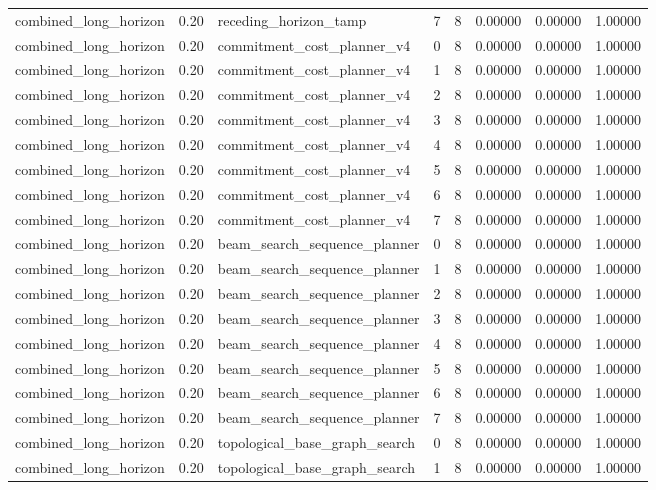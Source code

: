 \documentclass{article}
\begin{document}
\begin{table}[tbp]
{\begin{tabular}{llllllll}
combined\_long\_horizon & 0.20 & receding\_horizon\_tamp & 7 & 8 & 0.00000 & 0.00000 & 1.00000 \\
combined\_long\_horizon & 0.20 & commitment\_cost\_planner\_v4 & 0 & 8 & 0.00000 & 0.00000 & 1.00000 \\
combined\_long\_horizon & 0.20 & commitment\_cost\_planner\_v4 & 1 & 8 & 0.00000 & 0.00000 & 1.00000 \\
combined\_long\_horizon & 0.20 & commitment\_cost\_planner\_v4 & 2 & 8 & 0.00000 & 0.00000 & 1.00000 \\
combined\_long\_horizon & 0.20 & commitment\_cost\_planner\_v4 & 3 & 8 & 0.00000 & 0.00000 & 1.00000 \\
combined\_long\_horizon & 0.20 & commitment\_cost\_planner\_v4 & 4 & 8 & 0.00000 & 0.00000 & 1.00000 \\
combined\_long\_horizon & 0.20 & commitment\_cost\_planner\_v4 & 5 & 8 & 0.00000 & 0.00000 & 1.00000 \\
combined\_long\_horizon & 0.20 & commitment\_cost\_planner\_v4 & 6 & 8 & 0.00000 & 0.00000 & 1.00000 \\
combined\_long\_horizon & 0.20 & commitment\_cost\_planner\_v4 & 7 & 8 & 0.00000 & 0.00000 & 1.00000 \\
combined\_long\_horizon & 0.20 & beam\_search\_sequence\_planner & 0 & 8 & 0.00000 & 0.00000 & 1.00000 \\
combined\_long\_horizon & 0.20 & beam\_search\_sequence\_planner & 1 & 8 & 0.00000 & 0.00000 & 1.00000 \\
combined\_long\_horizon & 0.20 & beam\_search\_sequence\_planner & 2 & 8 & 0.00000 & 0.00000 & 1.00000 \\
combined\_long\_horizon & 0.20 & beam\_search\_sequence\_planner & 3 & 8 & 0.00000 & 0.00000 & 1.00000 \\
combined\_long\_horizon & 0.20 & beam\_search\_sequence\_planner & 4 & 8 & 0.00000 & 0.00000 & 1.00000 \\
combined\_long\_horizon & 0.20 & beam\_search\_sequence\_planner & 5 & 8 & 0.00000 & 0.00000 & 1.00000 \\
combined\_long\_horizon & 0.20 & beam\_search\_sequence\_planner & 6 & 8 & 0.00000 & 0.00000 & 1.00000 \\
combined\_long\_horizon & 0.20 & beam\_search\_sequence\_planner & 7 & 8 & 0.00000 & 0.00000 & 1.00000 \\
combined\_long\_horizon & 0.20 & topological\_base\_graph\_search & 0 & 8 & 0.00000 & 0.00000 & 1.00000 \\
combined\_long\_horizon & 0.20 & topological\_base\_graph\_search & 1 & 8 & 0.00000 & 0.00000 & 1.00000 \\
\bottomrule
\end{tabular}
}
\end{table}
\end{document}
